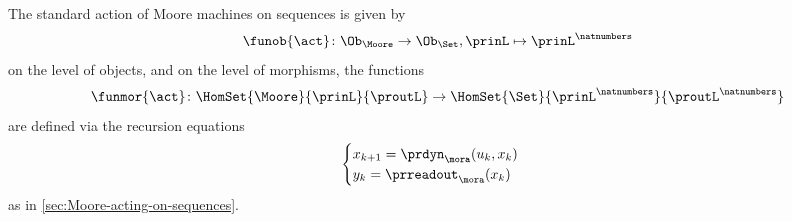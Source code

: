 \begin{definition}
\label{def:moore-standard-action-on-sequences}
The standard action of Moore machines on sequences is given by 
\begin{equation}
\funob{\act} \colon \Ob_{\Moore} \to \Ob_{\Set}, \prinL \mapsto \prinL^\natnumbers
\end{equation}
on the level of objects, and on the level of morphisms, the functions 
\begin{equation}
\funmor{\act} \colon  \HomSet{\Moore}{\prinL}{\proutL} \to \HomSet{\Set}{\prinL^\natnumbers}{\proutL^\natnumbers}
\end{equation}
are defined via the recursion equations
\begin{equation}
\label{eq:moore-recursion-once-again}
    \begin{cases}
        x_{k+1} = \prdyn_\mora(u_k, x_k) \\
        y_{k}   = \prreadout_\mora(x_{k})
    \end{cases}
\end{equation}
as in \cref{sec:Moore-acting-on-sequences}. 
\end{definition}



